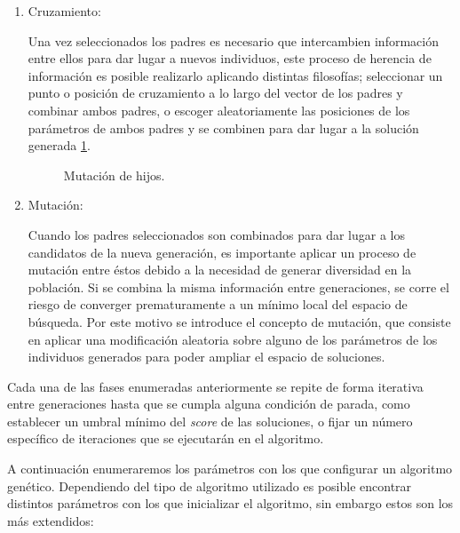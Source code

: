 \begin{enumerate}
                \item Cruzamiento:

                        Una vez seleccionados los padres es necesario que intercambien información entre ellos para dar lugar a nuevos individuos, este proceso de herencia de información es posible realizarlo aplicando distintas filosofías; seleccionar un punto o posición de cruzamiento a lo largo del vector de los padres y combinar ambos padres, o escoger aleatoriamente las posiciones de los parámetros de ambos padres y se combinen para dar lugar a la solución generada \ref{ParentsMatingMutation}.

                        \begin{figure}[h]
                            \centering
                            
                            \caption{Mutación de hijos.}
                            \label{ParentsMatingMutation}
                        \end{figure}

                \item Mutación:

                        Cuando los padres seleccionados son combinados para dar lugar a los candidatos de la nueva generación, es importante aplicar un proceso de mutación entre éstos debido a la necesidad de generar diversidad en la población. Si se combina la misma información entre generaciones, se corre el riesgo de converger prematuramente a un mínimo local del espacio de búsqueda. Por este motivo se introduce el concepto de mutación, que consiste en aplicar una modificación aleatoria sobre alguno de los parámetros de los individuos generados para poder ampliar el espacio de soluciones. 
            \end{enumerate}

            Cada una de las fases enumeradas anteriormente se repite de forma iterativa entre generaciones hasta que se cumpla alguna condición de parada, como establecer un umbral mínimo del \textit{score} de las soluciones, o fijar un número específico de iteraciones que se ejecutarán en el algoritmo.


            A continuación enumeraremos los parámetros con los que configurar un algoritmo genético. Dependiendo del tipo de algoritmo utilizado es posible encontrar distintos parámetros con los que inicializar el algoritmo, sin embargo estos son los más extendidos:


